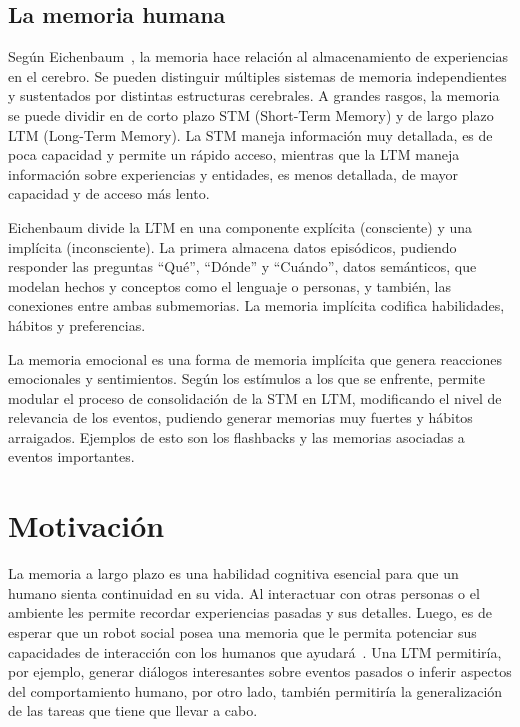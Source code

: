 \subsection{La memoria humana}

Según Eichenbaum~\cite{Eichenbaum:2008}, la memoria hace relación al almacenamiento de experiencias en el cerebro. Se pueden distinguir múltiples sistemas de memoria independientes y sustentados por distintas estructuras cerebrales. A grandes rasgos, la memoria se puede dividir en de corto plazo STM (Short-Term Memory) y de largo plazo LTM (Long-Term Memory). La STM maneja información muy detallada, es de poca capacidad y permite un rápido acceso, mientras que la LTM maneja información sobre experiencias y entidades, es menos detallada, de mayor capacidad y de acceso más lento.

Eichenbaum divide la LTM en una componente explícita (consciente) y una implícita (inconsciente). La primera almacena datos episódicos, pudiendo responder las preguntas ``Qué'', ``Dónde'' y ``Cuándo'', datos semánticos, que modelan hechos y conceptos como el lenguaje o personas, y también, las conexiones entre ambas submemorias. La memoria implícita codifica habilidades, hábitos y preferencias.

La memoria emocional es una forma de memoria implícita que genera reacciones emocionales y sentimientos. Según los estímulos a los que se enfrente, permite modular el proceso de consolidación de la STM en LTM, modificando el nivel de relevancia de los eventos, pudiendo generar memorias muy fuertes y hábitos arraigados. Ejemplos de esto son los flashbacks y las memorias asociadas a eventos importantes.




\section{Motivación}

La memoria a largo plazo es una habilidad cognitiva esencial para que un humano sienta continuidad en su vida. Al interactuar con otras personas o el ambiente les permite recordar experiencias pasadas y sus detalles. Luego, es de esperar que un robot social posea una memoria que le permita potenciar sus capacidades de interacción con los humanos que ayudará~\cite{Vijayakumar2014}. Una LTM permitiría, por ejemplo, generar diálogos interesantes sobre eventos pasados o inferir aspectos del comportamiento humano, por otro lado, también permitiría la generalización de las tareas que tiene que llevar a cabo.

